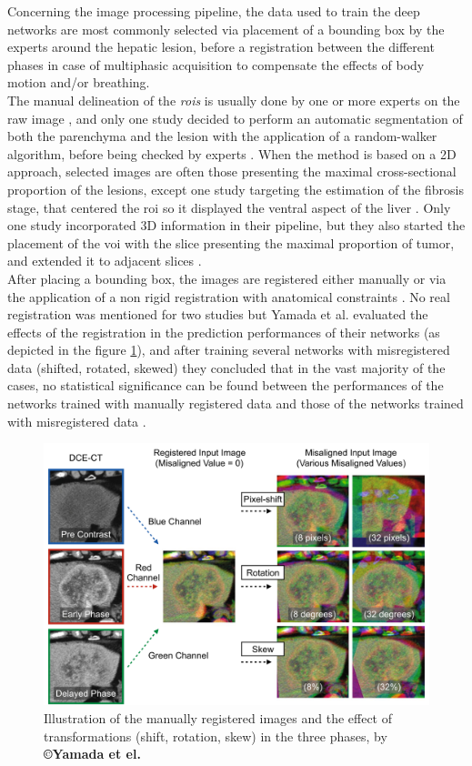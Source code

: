Concerning the image processing pipeline, the data used to train the
deep networks are most commonly selected via placement of a bounding box
by the experts around the hepatic lesion, before a registration between
the different phases in case of multiphasic acquisition to compensate the
effects of body motion and/or breathing.\\
The manual delineation of the \emph{\ac{roi}s} is usually done by one or more
experts on the raw image \cite{Yamada2019,Wang2018,Yasaka2018a,Yasaka2018,WANG2019}, and only
one study decided to perform an automatic segmentation of both the
parenchyma and the lesion with the application of a random-walker
algorithm, before being checked by experts \cite{Liang2018}. 
When the method is based on a 2D approach, selected images are
often those presenting the maximal cross-sectional proportion of the
lesions, except one study targeting the estimation of the fibrosis
stage, that centered the \ac{roi} so it displayed the ventral aspect
of the liver \cite{Yasaka2018a}. Only one study
incorporated 3D information in their pipeline, but they also started the
placement of the \ac{voi} with the slice presenting the maximal
proportion of tumor, and extended it to adjacent slices \cite{Yang2019}.\\
After placing a bounding box, the images are registered either manually \cite{Yamada2019,WANG2019,Wang2018} or
via the application of a non rigid registration with anatomical constraints \cite{Liang2018}. No real registration was mentioned for
two studies \cite{Peng2020,Yasaka2018a} but
Yamada et al. evaluated the effects of the registration in the
prediction performances of their networks (as depicted in the figure \ref{Yamada2019_Fig1}), 
and after training several networks with misregistered data
(shifted, rotated, skewed) they concluded that in the vast majority of
the cases, no statistical significance can be found between the
performances of the networks trained with manually registered data and
those of the networks trained with misregistered data \cite{Yamada2019}.


\begin{figure}[th!]
\centering
\includegraphics[width=0.7\linewidth]{images/image12}
\caption{Illustration of the manually registered images and the effect of transformations (shift, rotation, skew) in the three phases, by \textbf{©Yamada et el. \cite{Yamada2019}}}
\label{Yamada2019_Fig1}
\end{figure}


